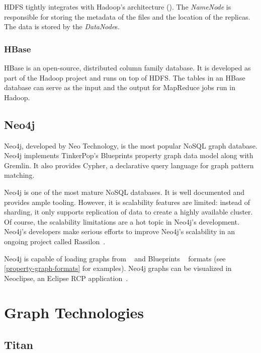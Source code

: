 HDFS tightly integrates with Hadoop's architecture (). The \emph{NameNode} is responsible for storing the metadata of the files and the location of the replicas. The data is stored by the \emph{DataNode}s.


\subsubsection{HBase}

HBase is an open-source, distributed column family database. It is developed as part of the Hadoop project and runs on top of HDFS. The tables in an HBase database can serve as the input and the output for MapReduce jobs run in Hadoop.

\subsection{Neo4j}
\label{neo4j}

Neo4j, developed by Neo Technology, is the most popular NoSQL graph database. Neo4j implements TinkerPop's Blueprints property graph data model along with Gremlin. It also provides Cypher, a declarative query language for graph pattern matching. 

Neo4j is one of the most mature NoSQL databases. It is well documented and provides ample tooling. However, it is scalability features are limited: instead of sharding, it only supports replication of data to create a highly available cluster. Of course, the scalability limitations are a hot topic in Neo4j's development. Neo4j's developers make serious efforts to improve Neo4j's scalability in an ongoing project called Rassilon~\cite{rassilon}.

Neo4j is capable of loading graphs from \graphml{}~\cite{GraphML} and Blueprints \graphson{}~\cite{BlueprintsGraphSON} formats (see \autoref{property-graph-formats} for examples). Neo4j graphs can be visualized in Neoclipse, an Eclipse RCP application~\cite{Neoclipse}. %

\section{Graph Technologies}

\subsection{Titan}
\label{titan}

